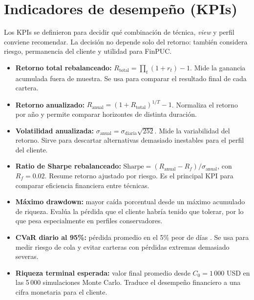 \section{Indicadores de desempe\~no (KPIs)}

Los KPIs se definieron para decidir qu\'e combinaci\'on de t\'ecnica,
\textit{view} y perfil conviene recomendar. La decisi\'on no depende solo del
retorno: tambi\'en considera riesgo, permanencia del cliente y utilidad para
FinPUC.

\begin{itemize}
    \item \textbf{Retorno total rebalanceado:}
    $R_{\text{total}} = \prod_t (1 + r_t) - 1$. Mide la ganancia acumulada
    fuera de muestra. Se usa para comparar el resultado final de cada cartera.

    \item \textbf{Retorno anualizado:}
    $R_{\text{anual}} = (1 + R_{\text{total}})^{1/T} - 1$. Normaliza el retorno
    por a\~no y permite comparar horizontes de distinta duraci\'on.

    \item \textbf{Volatilidad anualizada:}
    $\sigma_{\text{anual}} = \sigma_{\text{diaria}}\sqrt{252}$. Mide la
    variabilidad del retorno. Sirve para descartar alternativas demasiado
    inestables para el perfil del cliente.

    \item \textbf{Ratio de Sharpe rebalanceado:}
    $\text{Sharpe} = (R_{\text{anual}} - R_f)/\sigma_{\text{anual}}$, con
    $R_f = 0.02$. Resume retorno ajustado por riesgo. Es el principal KPI para
    comparar eficiencia financiera entre t\'ecnicas.

    \item \textbf{M\'aximo drawdown:} mayor ca\'ida porcentual desde un m\'aximo
    acumulado de riqueza. Eval\'ua la p\'erdida que el cliente habr\'ia tenido
    que tolerar, por lo que pesa especialmente en perfiles conservadores.

    \item \textbf{CVaR diario al 95\%:} p\'erdida promedio en el 5\% peor de
    d\'ias \cite{rockafellar2000}. Se usa para medir riesgo de cola y evitar
    carteras con p\'erdidas extremas demasiado severas.

    \item \textbf{Riqueza terminal esperada:} valor final promedio desde
    $C_0 = 1\,000$ USD en las 5\,000 simulaciones Monte Carlo. Traduce el
    desempe\~no financiero a una cifra monetaria para el cliente.


\end{itemize}
